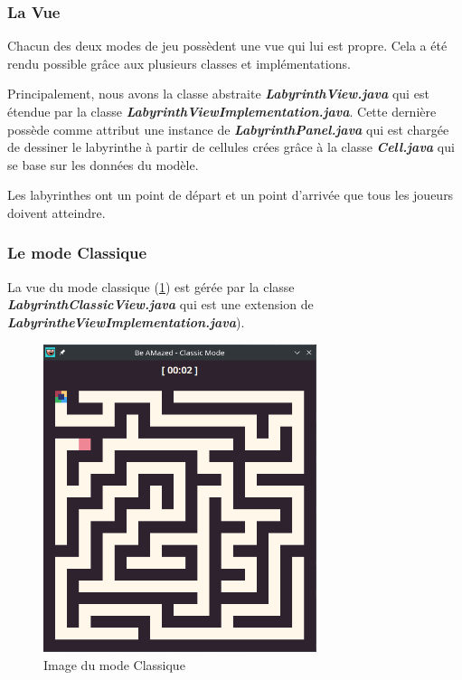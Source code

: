 \subsubsection{La Vue}
\label{subsubsec:vue}

Chacun des deux modes de jeu possèdent une vue qui lui est propre.
Cela a été rendu possible grâce aux plusieurs classes et implémentations.

Principalement, nous avons la classe abstraite \textbf{\textit{LabyrinthView.java}} qui est étendue par la classe \textbf{\textit{LabyrinthViewImplementation.java}}.
Cette dernière possède comme attribut une instance de
\textbf{\textit{LabyrinthPanel.java}} qui est chargée de dessiner le labyrinthe à partir de cellules crées grâce à la classe \textbf{\textit{Cell.java}} qui se base sur les données du modèle.

Les labyrinthes ont un point de départ et un point d'arrivée que tous les joueurs doivent atteindre.
\subsubsection*{Le mode Classique}

La vue du mode classique (\ref{fig:ClassicModeLabyrinth}) est gérée par la classe \textbf{\textit{LabyrinthClassicView.java}} qui est une extension de \textbf{\textit{LabyrintheViewImplementation.java}}).

\begin{figure}[!htb]%
    \centering
    \includegraphics[width=8cm]{ressources/Implementation/Labyrinthe/Vue/Classic/Classic.png}%
    \caption{Image du mode Classique}%
    \label{fig:ClassicModeLabyrinth}
\end{figure}
